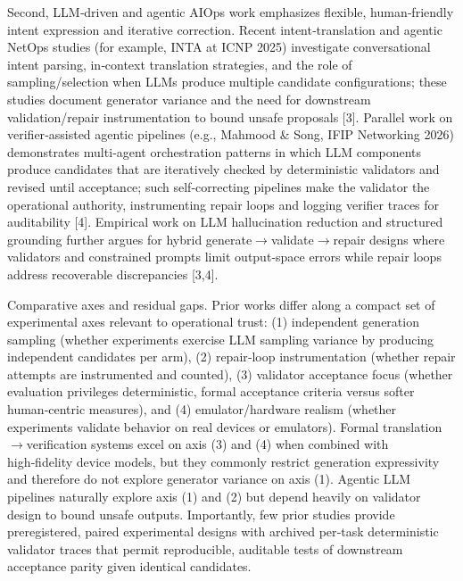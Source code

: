 \documentclass[conference]{IEEEtran}
\begin{document}
Second, LLM‑driven and agentic AIOps work emphasizes flexible, human‑friendly intent expression and iterative correction. Recent intent‑translation and agentic NetOps studies (for example, INTA at ICNP 2025) investigate conversational intent parsing, in‑context translation strategies, and the role of sampling/selection when LLMs produce multiple candidate configurations; these studies document generator variance and the need for downstream validation/repair instrumentation to bound unsafe proposals [3]. Parallel work on verifier‑assisted agentic pipelines (e.g., Mahmood \& Song, IFIP Networking 2026) demonstrates multi‑agent orchestration patterns in which LLM components produce candidates that are iteratively checked by deterministic validators and revised until acceptance; such self‑correcting pipelines make the validator the operational authority, instrumenting repair loops and logging verifier traces for auditability [4]. Empirical work on LLM hallucination reduction and structured grounding further argues for hybrid generate\ensuremath{\rightarrow}validate\ensuremath{\rightarrow}repair designs where validators and constrained prompts limit output‑space errors while repair loops address recoverable discrepancies [3,4].

Comparative axes and residual gaps. Prior works differ along a compact set of experimental axes relevant to operational trust: (1) independent generation sampling (whether experiments exercise LLM sampling variance by producing independent candidates per arm), (2) repair‑loop instrumentation (whether repair attempts are instrumented and counted), (3) validator acceptance focus (whether evaluation privileges deterministic, formal acceptance criteria versus softer human‑centric measures), and (4) emulator/hardware realism (whether experiments validate behavior on real devices or emulators). Formal translation\ensuremath{\rightarrow}verification systems excel on axis (3) and (4) when combined with high‑fidelity device models, but they commonly restrict generation expressivity and therefore do not explore generator variance on axis (1). Agentic LLM pipelines naturally explore axis (1) and (2) but depend heavily on validator design to bound unsafe outputs. Importantly, few prior studies provide preregistered, paired experimental designs with archived per‑task deterministic validator traces that permit reproducible, auditable tests of downstream acceptance parity given identical candidates.
\end{document}
